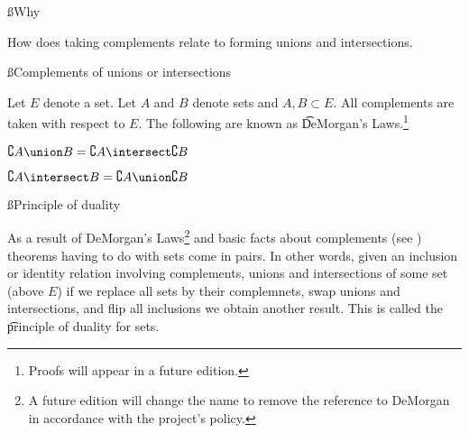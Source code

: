 
\ss{Why}

How does taking complements relate to forming unions and intersections.

\ss{Complements of unions or intersections}

Let $E$ denote a set.
Let $A$ and $B$ denote sets and $A, B \subset E$.
All complements are taken with respect to $E$.
The following are known as \t{DeMorgan's Laws}.\footnote{Proofs will appear in a future edition.}

\begin{proposition}
  $\complement{A \union B} = \complement{A} \intersect \complement{B}$
\end{proposition}

\begin{proposition}
  $\complement{A \intersect B} = \complement{A} \union \complement{B}$
\end{proposition}

\ss{Principle of duality}

As a result of DeMorgan's Laws\footnote{A future edition will change the name to remove the reference to DeMorgan in accordance with the project's policy.} and basic facts about complements (see ) theorems having to do with sets come in pairs.
In other words, given an inclusion or identity relation involving complements, unions and intersections of some set (above $E$) if we replace all sets by their complemnets, swap unions and intersections, and flip all inclusions we obtain another result.
This is called the \t{principle of duality} for sets.



